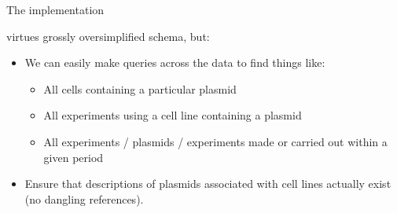 \documentclass[pdf]{beamer}
\begin{document}
\begin{frame}{The implementation}
\begin{figure}[ht]
  \end{figure}
\end{frame}

\begin{frame}{virtues}
  grossly oversimplified schema, but:
  \begin{itemize}
  \item We can easily make queries across the data to find things like:
    \begin{itemize}
    \item All cells containing a particular plasmid
    \item All experiments using a cell line containing a plasmid
    \item All experiments / plasmids / experiments made or carried out
      within a given period
    \end{itemize}
  \item Ensure that descriptions of plasmids associated with cell lines
    actually exist (no dangling references).
  \end{itemize}
\end{frame}
\end{document}
